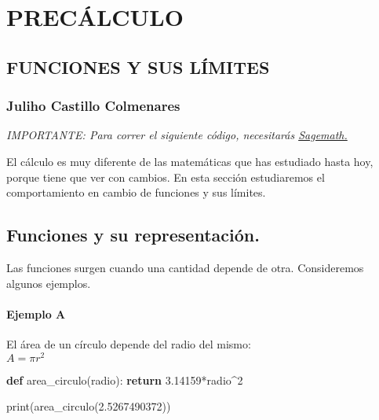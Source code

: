 \documentclass[
]{article}
\author{}
\date{}
\newenvironment{Shaded}{}{}
\newcommand{\BuiltInTok}[1]{#1}
\newcommand{\ControlFlowTok}[1]{\textcolor[rgb]{0.00,0.44,0.13}{\textbf{#1}}}
\newcommand{\DecValTok}[1]{\textcolor[rgb]{0.25,0.63,0.44}{#1}}
\newcommand{\FloatTok}[1]{\textcolor[rgb]{0.25,0.63,0.44}{#1}}
\newcommand{\KeywordTok}[1]{\textcolor[rgb]{0.00,0.44,0.13}{\textbf{#1}}}
\newcommand{\NormalTok}[1]{#1}
\newcommand{\OperatorTok}[1]{\textcolor[rgb]{0.40,0.40,0.40}{#1}}
\begin{document}
\hypertarget{precuxe1lculo}{%
\section{PRECÁLCULO}\label{precuxe1lculo}}

\hypertarget{funciones-y-sus-luxedmites}{%
\subsection{FUNCIONES Y SUS LÍMITES}\label{funciones-y-sus-luxedmites}}

\hypertarget{juliho-castillo-colmenares}{%
\subsubsection{\texorpdfstring{Juliho Castillo Colmenares
}{Juliho Castillo Colmenares }}\label{juliho-castillo-colmenares}}

\emph{IMPORTANTE: Para correr el siguiente código, necesitarás
\href{https://youtu.be/8KT9GMruOrU}{Sagemath.}}

El cálculo es muy diferente de las matemáticas que has estudiado hasta
hoy, porque tiene que ver con cambios. En esta sección estudiaremos el
comportamiento en cambio de funciones y sus límites.

\hypertarget{funciones-y-su-representaciuxf3n}{%
\subsection{\texorpdfstring{Funciones y su representación.
}{Funciones y su representación. }}\label{funciones-y-su-representaciuxf3n}}

Las funciones surgen cuando una cantidad depende de otra. Consideremos
algunos ejemplos.

\hypertarget{ejemplo-a}{%
\paragraph{Ejemplo A}\label{ejemplo-a}}

El área de un círculo depende del radio del mismo:\\
\( A = \pi r^2 \)

\begin{Shaded}
\begin{Highlighting}[]
\KeywordTok{def}\NormalTok{ area\_circulo(radio):}
    \ControlFlowTok{return} \FloatTok{3.14159}\OperatorTok{*}\NormalTok{radio}\OperatorTok{\^{}}\DecValTok{2}

\BuiltInTok{print}\NormalTok{(area\_circulo(}\FloatTok{2.5267490372}\NormalTok{))}
\end{Highlighting}
\end{Shaded}
\end{document}
